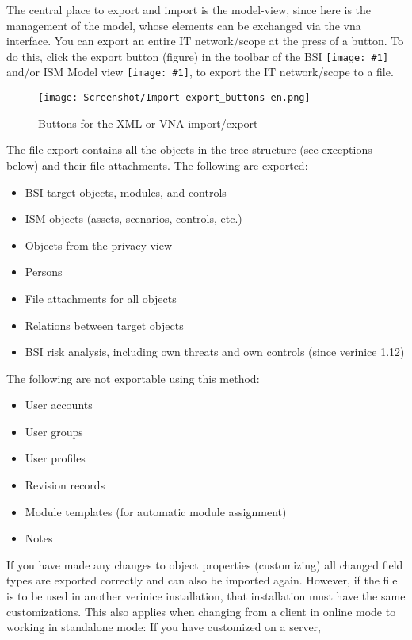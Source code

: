 \documentclass[a4paper,10pt]{book}
\newcommand{\icon}[1]{\texttt{[image: \#1]}}
\begin{document}
The central place to export and import is the model-view, since here is the management of the model, whose elements can be exchanged via the vna interface. You can export an entire IT network/scope at the press of a button. To do this, click the export button (figure) in the
toolbar of the BSI \icon{Icon/GS_Modell.png} and/or ISM Model view \icon{Icon/Informationssicherheitsmodell.png},
to export the IT network/scope to a file.
\newline
\begin{figure}[htb!]
  \centering
  \texttt{[image: Screenshot/Import-export\_buttons-en.png]}
  \caption{\label{fig:buttons-xml-vna-import} Buttons for the XML or VNA import/export}
\end{figure}
\newline
The file export contains all the objects in the tree structure (see exceptions below) and their file attachments.
The following are exported:
\begin{itemize}
 \item BSI target objects, modules, and controls
 \item ISM objects (assets, scenarios, controls, etc.)
 \item Objects from the privacy view
 \item Persons
 \item File attachments for all objects
 \item Relations between target objects
 \item BSI risk analysis, including own threats and own controls
   (since verinice 1.12)
\end{itemize}
The following are not exportable using this method:
\begin{itemize}
 \item User accounts
 \item User groups
 \item User profiles
 \item Revision records
 \item Module templates (for automatic module assignment)
 \item Notes
\end{itemize}
If you have made any changes to object properties (customizing) all changed field types are exported
correctly and can also be imported again. However, if the file is to be used in another verinice
installation, that installation must have the same customizations. This also applies when changing
from a client in online mode to working in standalone mode: If you have customized on a server,
\end{document}
